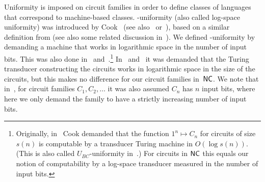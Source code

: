 Uniformity is imposed on circuit families in order to define classes of languages that correspond to machine-based classes. 
\LOGSPACE-uniformity (also called log-space uniformity)
was introduced by Cook~\cite[p.~338]{DBLP:conf/stoc/Cook79}
(see also~\cite[p.~47]{Vollmer99} or~\cite[Def.~4.2]{DBLP:series/eatcs/BalcazarDG90}),
based on a similar definition from \cite[p.~738]{DBLP:journals/siamcomp/Borodin77}  (see also some related discussion in~\cite{DBLP:conf/fct/Cook83,DBLP:journals/iandc/Cook85}).
We defined \LOGSPACE-uniformity by demanding a machine that works in logarithmic space
in the number of input bits.
This was also done in~\cite[p.~338]{DBLP:conf/stoc/Cook79}
and~\cite[p.~4]{DBLP:journals/eatcs/Allender01}.\footnote{Originally, 
	in~\cite{DBLP:conf/stoc/Cook79} Cook demanded that the function $1^n \mapsto C_n$ 
	for circuits of size $s(n)$
	is computable by a transducer Turing machine in $O(\log s(n))$. 
	(This is also called $U_{BC}$-uniformity in~\cite{DBLP:journals/jcss/Ruzzo81,Wegener87}.)
	For circuits in $\textup{\textsf{NC}}$ this equals our notion of computability by a log-space transducer
	measured in the number of input bits.}
In~\cite[p.~47]{Vollmer99} and~\cite[Def.~4.2]{DBLP:series/eatcs/BalcazarDG90}
it was demanded that the Turing transducer constructing the circuits
works in logarithmic space in the size of the circuits, but this makes no difference
for our circuit families in~$\textup{\textsf{NC}}$. We note that in~\cite{DBLP:journals/eatcs/Allender01,DBLP:conf/stoc/Cook79,Vollmer99,DBLP:series/eatcs/BalcazarDG90},
for circuit families $C_1, C_2, \ldots$
it was also assumed $C_n$ has $n$ input bits, where here we only demand
the family to have a strictly increasing number of input bits.

